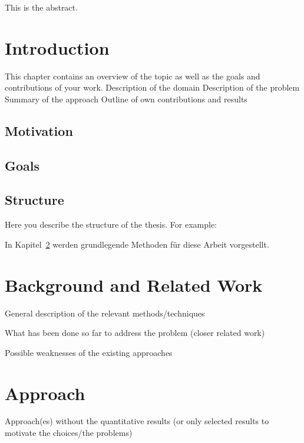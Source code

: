 \documentclass[
     12pt,                    %
     a4paper,             %
     BCOR10mm,     %
     DIV14,                 %
     listof=totoc,                    %
     bibliography=totoc,       %
     index=totoc,              %
     twoside,
     headsepline
     ]{scrreprt}
\begin{document}
This is the abstract.

\cleardoublepage

\tableofcontents
\cleardoublepage
{} 

\listoffigures
\listoftables
\cleardoublepage


\chapter{Introduction}\label{intro}
This chapter contains an overview of the topic as well as the goals and contributions of your work.
Description of the domain
Description of the problem
Summary of the approach
Outline of own contributions and results
\section{Motivation}

\section{Goals}

\section{Structure}
Here you describe the structure of the thesis. For example:

In Kapitel~\ref{background} werden grundlegende Methoden für diese Arbeit vorgestellt.


\chapter{Background and Related Work}\label{background}
General description of the relevant methods/techniques

What has been done so far to address the problem (closer related work)

Possible weaknesses of the existing approaches



\chapter{Approach}
Approach(es) without the quantitative results (or only selected results to motivate the choices/the problems)
\end{document}
